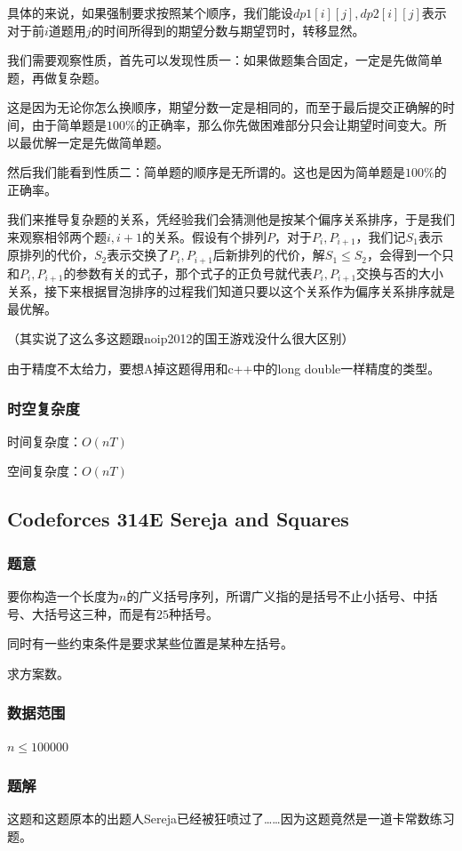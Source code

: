 \documentclass{ctexart}
\begin{document}
具体的来说，如果强制要求按照某个顺序，我们能设$dp1[i][j],dp2[i][j]$表示对于前$i$道题用$j$的时间所得到的期望分数与期望罚时，转移显然。

我们需要观察性质，首先可以发现性质一：如果做题集合固定，一定是先做简单题，再做复杂题。

这是因为无论你怎么换顺序，期望分数一定是相同的，而至于最后提交正确解的时间，由于简单题是$100\%$的正确率，那么你先做困难部分只会让期望时间变大。所以最优解一定是先做简单题。

然后我们能看到性质二：简单题的顺序是无所谓的。这也是因为简单题是$100\%$的正确率。

我们来推导复杂题的关系，凭经验我们会猜测他是按某个偏序关系排序，于是我们来观察相邻两个题$i,i+1$的关系。假设有个排列$P$，对于$P_i,P_{i+1}$，我们记$S_1$表示原排列的代价，$S_2$表示交换了$P_i,P_{i+1}$后新排列的代价，解$S_1 \le S_2$，会得到一个只和$P_i,P_{i+1}$的参数有关的式子，那个式子的正负号就代表$P_i,P_{i+1}$交换与否的大小关系，接下来根据冒泡排序的过程我们知道只要以这个关系作为偏序关系排序就是最优解。

（其实说了这么多这题跟noip2012的国王游戏没什么很大区别）

由于精度不太给力，要想A掉这题得用和c++中的long double一样精度的类型。
\subsubsection{时空复杂度}
时间复杂度：$O(nT)$

空间复杂度：$O(nT)$
\subsection{Codeforces 314E Sereja and Squares}
\subsubsection{题意}
要你构造一个长度为$n$的广义括号序列，所谓广义指的是括号不止小括号、中括号、大括号这三种，而是有$25$种括号。

同时有一些约束条件是要求某些位置是某种左括号。

求方案数。
\subsubsection{数据范围}
$n \le 100000$
\subsubsection{题解}
这题和这题原本的出题人Sereja已经被狂喷过了……因为这题竟然是一道卡常数练习题。
\end{document}
